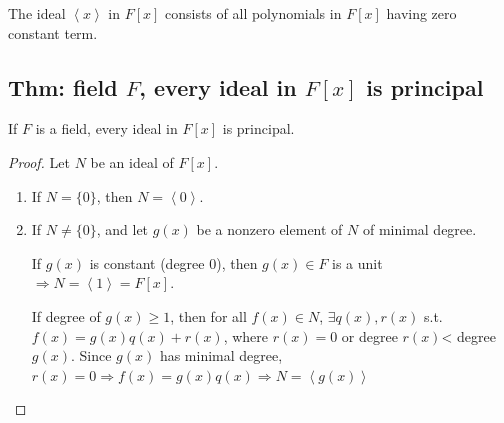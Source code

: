 \documentclass[11pt]{elegantbook}
\begin{document}
\begin{example}
    The ideal $\left\langle x\right\rangle$ in $F[x]$ consists of all polynomials in $F[x]$ having zero constant term.
\end{example}

\subsection{Thm: field $F$, every ideal in $F[x]$ is principal}
\begin{theorem}
    If $F$ is a field, every ideal in $F[x]$ is principal.
\end{theorem}
\begin{proof}
Let $N$ be an ideal of $F[x]$.
\begin{enumerate}
    \item If $N=\{0\}$, then $N=\left\langle 0\right\rangle$.
    \item If $N\neq\{0\}$, and let $g(x)$ be a nonzero element of $N$ of minimal degree.
    
    If $g(x)$ is constant (degree $0$), then $g(x)\in F$ is a unit $\Rightarrow N=\left\langle 1\right\rangle=F[x]$.

    If degree of $g(x)\geq 1$, then for all $f(x)\in N$, $\exists q(x),r(x)$ s.t. $f(x)=g(x)q(x)+r(x)$, where $r(x)=0$ or degree $r(x)$< degree $g(x)$. Since $g(x)$ has minimal degree, $r(x)=0 \Rightarrow f(x)=g(x)q(x) \Rightarrow N=\left\langle g(x)\right\rangle$
\end{enumerate}
\end{proof}
\end{document}
